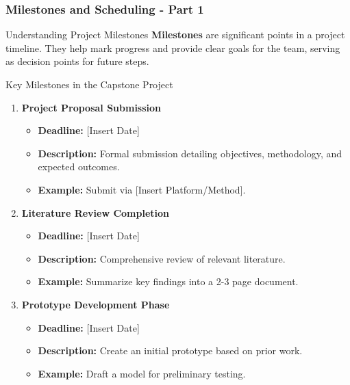 \documentclass[aspectratio=169]{beamer}
\begin{document}
\begin{frame}[fragile]
  \frametitle{Milestones and Scheduling - Part 1}
  
  \begin{block}{Understanding Project Milestones}
    \small{\textbf{Milestones} are significant points in a project timeline. They help mark progress and provide clear goals for the team, serving as decision points for future steps.}
  \end{block}

  \begin{block}{Key Milestones in the Capstone Project}
    \begin{enumerate}
      \item \textbf{Project Proposal Submission} 
        \begin{itemize}
          \item \textbf{Deadline:} [Insert Date]
          \item \textbf{Description:} Formal submission detailing objectives, methodology, and expected outcomes.
          \item \textbf{Example:} Submit via [Insert Platform/Method].
        \end{itemize}
      \item \textbf{Literature Review Completion}
        \begin{itemize}
          \item \textbf{Deadline:} [Insert Date]
          \item \textbf{Description:} Comprehensive review of relevant literature.
          \item \textbf{Example:} Summarize key findings into a 2-3 page document.
        \end{itemize}
      \item \textbf{Prototype Development Phase}
        \begin{itemize}
          \item \textbf{Deadline:} [Insert Date]
          \item \textbf{Description:} Create an initial prototype based on prior work.
          \item \textbf{Example:} Draft a model for preliminary testing.
        \end{itemize}
    \end{enumerate}
  \end{block}
\end{frame}
\end{document}
